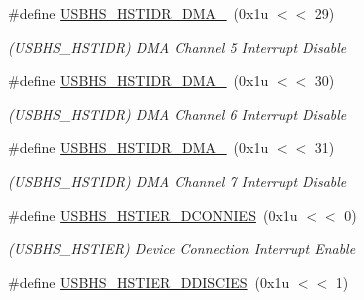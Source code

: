 \begin{DoxyCompactItemize}
\mbox{\label{group__SAME70__USBHS_ga11082945215e5922c3f667372e20d570}} 
\#define \mbox{\hyperlink{group__SAME70__USBHS_ga11082945215e5922c3f667372e20d570}{U\+S\+B\+H\+S\+\_\+\+H\+S\+T\+I\+D\+R\+\_\+\+D\+M\+A\+\_}}~(0x1u $<$$<$ 29)
\begin{DoxyCompactList}\small\item\em (U\+S\+B\+H\+S\+\_\+\+H\+S\+T\+I\+DR) D\+MA Channel 5 Interrupt Disable \end{DoxyCompactList}\item 
\mbox{\label{group__SAME70__USBHS_gaf14eb02f7bd49e644a2436e86c3c5e97}} 
\#define \mbox{\hyperlink{group__SAME70__USBHS_gaf14eb02f7bd49e644a2436e86c3c5e97}{U\+S\+B\+H\+S\+\_\+\+H\+S\+T\+I\+D\+R\+\_\+\+D\+M\+A\+\_}}~(0x1u $<$$<$ 30)
\begin{DoxyCompactList}\small\item\em (U\+S\+B\+H\+S\+\_\+\+H\+S\+T\+I\+DR) D\+MA Channel 6 Interrupt Disable \end{DoxyCompactList}\item 
\mbox{\label{group__SAME70__USBHS_ga4c3e5f19e87931dbac7660d1ef1a7017}} 
\#define \mbox{\hyperlink{group__SAME70__USBHS_ga4c3e5f19e87931dbac7660d1ef1a7017}{U\+S\+B\+H\+S\+\_\+\+H\+S\+T\+I\+D\+R\+\_\+\+D\+M\+A\+\_}}~(0x1u $<$$<$ 31)
\begin{DoxyCompactList}\small\item\em (U\+S\+B\+H\+S\+\_\+\+H\+S\+T\+I\+DR) D\+MA Channel 7 Interrupt Disable \end{DoxyCompactList}\item 
\mbox{\label{group__SAME70__USBHS_ga09be10f559e69bb67edafc93a6585788}} 
\#define \mbox{\hyperlink{group__SAME70__USBHS_ga09be10f559e69bb67edafc93a6585788}{U\+S\+B\+H\+S\+\_\+\+H\+S\+T\+I\+E\+R\+\_\+\+D\+C\+O\+N\+N\+I\+ES}}~(0x1u $<$$<$ 0)
\begin{DoxyCompactList}\small\item\em (U\+S\+B\+H\+S\+\_\+\+H\+S\+T\+I\+ER) Device Connection Interrupt Enable \end{DoxyCompactList}\item 
\mbox{\label{group__SAME70__USBHS_ga20152f5f9facf06b69f6b83fba5f6cfd}} 
\#define \mbox{\hyperlink{group__SAME70__USBHS_ga20152f5f9facf06b69f6b83fba5f6cfd}{U\+S\+B\+H\+S\+\_\+\+H\+S\+T\+I\+E\+R\+\_\+\+D\+D\+I\+S\+C\+I\+ES}}~(0x1u $<$$<$ 1)
$$
\end{DoxyCompactItemize}
